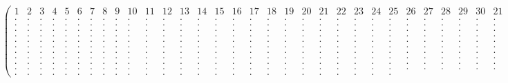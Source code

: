 \begin{landscape}
{\tiny
\[
\left(
\begin{array}{c|c|c|c|c|c|c|c|c|c|c|c|c|c|c|c|c|c|c|c|c|c|c|c|c|c|c|c|c|c|c|c|c|c|c|c|c|c|c|c|c|c|c}
1 & 2 & 3 & 4 & 5 & 6 & 7 & 8 & 9 &
10 & 11 &12 &13 &14 &15& 16& 17& 18& 19 &
20 &21 &22 &23 & 24 & 25 & 26 & 27 & 28 & 29 &
30 &21 &22 &23 & 24 & 25 & 26 & 27 & 28 & 29 &
40 & 41 & 42 & 43 \\
. & . & . & . & . & . & . & . & . & . & . & . & . & . & . & . & . & . & . & . & . & . & . & . & . & 
. & . & . & . & . & . & . & . & . & . & . & . & . & . & . & . & . & . \\
. & . & . & . & . & . & . & . & . & . & . & . & . & . & . & . & . & . & . & . & . & . & . & . & . & 
. & . & . & . & . & . & . & . & . & . & . & . & . & . & . & . & . & . \\
. & . & . & . & . & . & . & . & . & . & . & . & . & . & . & . & . & . & . & . & . & . & . & . & . & 
. & . & . & . & . & . & . & . & . & . & . & . & . & . & . & . & . & . \\
. & . & . & . & . & . & . & . & . & . & . & . & . & . & . & . & . & . & . & . & . & . & . & . & . & 
. & . & . & . & . & . & . & . & . & . & . & . & . & . & . & . & . & . \\
. & . & . & . & . & . & . & . & . & . & . & . & . & . & . & . & . & . & . & . & . & . & . & . & . & 
. & . & . & . & . & . & . & . & . & . & . & . & . & . & . & . & . & . \\
. & . & . & . & . & . & . & . & . & . & . & . & . & . & . & . & . & . & . & . & . & . & . & . & . & 
. & . & . & . & . & . & . & . & . & . & . & . & . & . & . & . & . & . \\
. & . & . & . & . & . & . & . & . & . & . & . & . & . & . & . & . & . & . & . & . & . & . & . & . & 
. & . & . & . & . & . & . & . & . & . & . & . & . & . & . & . & . & . \\
. & . & . & . & . & . & . & . & . & . & . & . & . & . & . & . & . & . & . & . & . & . & . & . & . & 
. & . & . & . & . & . & . & . & . & . & . & . & . & . & . & . & . & . \\
. & . & . & . & . & . & . & . & . & . & . & . & . & . & . & . & . & . & . & . & . & . & . & . & . & 
. & . & . & . & . & . & . & . & . & . & . & . & . & . & . & . & . & . \\
. & . & . & . & . & . & . & . & . & . & . & . & . & . & . & . & . & . & . & . & . & . & . & . & . & 
. & . & . & . & . & . & . & . & . & . & . & . & . & . & . & . & . & . \\
\hline
. & . & . & . & . & . & . & . & . & . & . & . & . & . & . & . & . & . & . & . & . & . & . & . & . & 

\end{array}\]}
\end{landscape}
